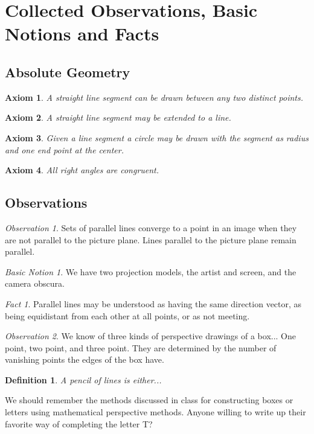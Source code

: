 \documentclass[12pt]{amsart}
\newtheorem{definition}[theorem]{Definition}
\newtheorem{axiom}{Axiom}
\theoremstyle{remark}
\newtheorem*{observation}{Observation}
\newtheorem*{basic notion}{Basic Notion}
\newtheorem{fact}{Fact}
\theoremstyle{mycomment}
\begin{document}
\thispagestyle{fancy}
\section{Collected Observations, Basic Notions and Facts}
\subsection{Absolute Geometry}
\begin{axiom} A straight line segment can be drawn between any two distinct points.\end{axiom} 
\begin{axiom} A straight line segment may be extended to a line.\end{axiom}
\begin{axiom} Given a line segment a circle may be drawn with the segment as radius and one end point at the center.\end{axiom}
\begin{axiom} All right angles are congruent.\end{axiom}
\subsection{Observations}
\begin{observation} Sets of parallel lines converge to a point in an image when they are not parallel to the picture plane. Lines parallel to the picture plane remain parallel.
\end{observation}
\begin{basic notion} We have two projection models, the artist and screen, and the camera obscura.\end{basic notion}
\begin{fact} Parallel lines may be understood as having the same direction vector, as being equidistant from each other at all points, or as not meeting.\end{fact}
\begin{observation} We know of three kinds of perspective drawings of a box... One point, two point, and three point. They are determined by the number of vanishing points the edges of the box have. \end{observation}
\begin{definition} A \emph{pencil of lines} is either...
\end{definition} 

We should remember the methods discussed in class for constructing boxes or letters using mathematical perspective methods. Anyone willing to write up their favorite way of completing the letter T?
\end{document}
